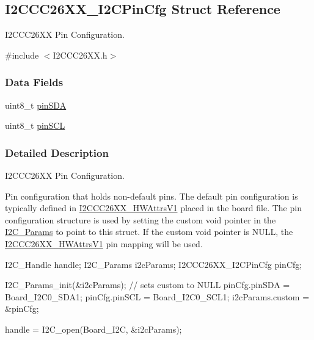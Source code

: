 \subsection{I2\+C\+C\+C26\+X\+X\+\_\+\+I2\+C\+Pin\+Cfg Struct Reference}
\label{struct_i2_c_c_c26_x_x___i2_c_pin_cfg}


I2\+C\+C\+C26\+X\+X Pin Configuration.  




{\ttfamily \#include $<$I2\+C\+C\+C26\+X\+X.\+h$>$}

\subsubsection*{Data Fields}
\begin{DoxyCompactItemize}
\item 
uint8\+\_\+t \hyperlink{struct_i2_c_c_c26_x_x___i2_c_pin_cfg_a07155d4bf6fac9ed7181eca65563e2c9}{pin\+S\+D\+A}
\item 
uint8\+\_\+t \hyperlink{struct_i2_c_c_c26_x_x___i2_c_pin_cfg_af6a6d421ac74746b80065a3e9de338d6}{pin\+S\+C\+L}
\end{DoxyCompactItemize}


\subsubsection{Detailed Description}
I2\+C\+C\+C26\+X\+X Pin Configuration. 

Pin configuration that holds non-\/default pins. The default pin configuration is typically defined in \hyperlink{struct_i2_c_c_c26_x_x___h_w_attrs_v1}{I2\+C\+C\+C26\+X\+X\+\_\+\+H\+W\+Attrs\+V1} placed in the board file. The pin configuration structure is used by setting the custom void pointer in the \hyperlink{struct_i2_c___params}{I2\+C\+\_\+\+Params} to point to this struct. If the custom void pointer is N\+U\+L\+L, the \hyperlink{struct_i2_c_c_c26_x_x___h_w_attrs_v1}{I2\+C\+C\+C26\+X\+X\+\_\+\+H\+W\+Attrs\+V1} pin mapping will be used. 
\begin{DoxyCode}
I2C_Handle handle;
I2C_Params i2cParams;
I2CCC26XX_I2CPinCfg pinCfg;

I2C_Params_init(&i2cParams);     \textcolor{comment}{// sets custom to NULL}
pinCfg.pinSDA = Board\_I2C0\_SDA1;
pinCfg.pinSCL = Board\_I2C0\_SCL1;
i2cParams.custom = &pinCfg;

handle = I2C_open(Board\_I2C, &i2cParams);
\end{DoxyCode}
 

